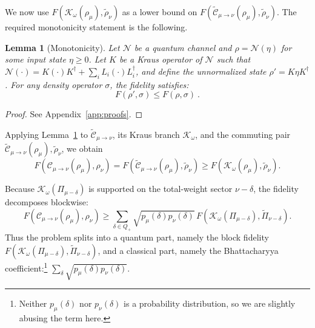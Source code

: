 \documentclass[a4paper,onecolumn,11pt]{quantumarticle}
\newtheorem{lem}{Lemma}
\def\C{\mathcal{C}}
\begin{document}
We now use \(F(\mathcal K_\omega(\rho_\mu),\widetilde{\rho}_\nu)\) as a lower bound on
\(F(\widetilde{\C}_{\mu\to\nu}(\rho_\mu),\widetilde{\rho}_\nu)\). The required monotonicity statement is the following.

\begin{lem}[Monotonicity]\label{lem:monotonicity}
    Let $\mathcal{N}$ be a quantum channel and $\rho = \mathcal{N}(\eta)$ for some input state $\eta \geq 0$. Let $K$ be a Kraus operator of $\mathcal{N}$ such that $\mathcal{N}(\cdot) = K(\cdot)K^\dagger + \sum_{i} L_i (\cdot) L_i^\dagger$, and define the unnormalized state $\rho' = K \eta K^\dagger$. For any density operator $\sigma$, the fidelity satisfies:
    \begin{equation}
        F(\rho', \sigma) \leq F(\rho, \sigma) \ .
    \end{equation}
\end{lem}
\begin{proof}
See Appendix~\ref{app:proofs}.
\end{proof}

Applying Lemma~\ref{lem:monotonicity} to \(\widetilde{\C}_{\mu\to\nu}\), its Kraus branch \(\mathcal K_\omega\), and the commuting pair
\(\widetilde{\C}_{\mu\to\nu}(\rho_\mu),\widetilde{\rho}_\nu\), we obtain
\begin{equation}\label{eq:forward_monotonicity}
    F(\C_{\mu\to\nu}(\rho_\mu),\rho_\nu)
    =
    F(\widetilde{\C}_{\mu\to\nu}(\rho_\mu),\widetilde{\rho}_\nu)
    \ge
    F(\mathcal K_\omega(\rho_\mu),\widetilde{\rho}_\nu).
\end{equation}

Because \(\mathcal K_\omega(\Pi_{\mu-\delta})\) is supported on the total-weight sector \(\nu-\delta\), the fidelity decomposes blockwise:
\begin{equation}\label{eq:block_fidelity}
    F(\C_{\mu\to\nu}(\rho_\mu),\rho_\nu)
    \ge
    \sum_{\delta\in Q_+}
    \sqrt{p_\mu(\delta)p_\nu(\delta)}\,
    F(\mathcal K_\omega(\Pi_{\mu-\delta}),\widetilde{\Pi}_{\nu-\delta}) .
\end{equation}
Thus the problem splits into a quantum part, namely the block fidelity
\(F(\mathcal K_\omega(\Pi_{\mu-\delta}),\widetilde{\Pi}_{\nu-\delta})\), and a classical part, namely the Bhattacharyya coefficient:\footnote{Neither $p_\mu(\delta)$ nor $p_\nu(\delta)$ is a probability distribution, so we are slightly abusing the term here.} \(\sum_\delta \sqrt{p_\mu(\delta)p_\nu(\delta)}\).\\
\end{document}
